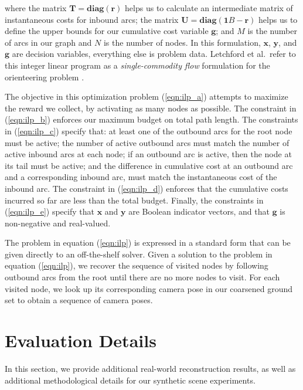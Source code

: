 %
where
the matrix $\mathbf{T} = \mathbf{diag}( \mathbf{r} )$ helps us to calculate an intermediate matrix of instantaneous costs for inbound arcs;
the matrix $\mathbf{U} = \mathbf{diag}( \mathbf{1}B - \mathbf{r} )$ helps us to define the upper bounds for our cumulative cost variable $\mathbf{g}$;
and $M$ is the number of arcs in our graph and $N$ is the number of nodes. 
In this formulation, $\mathbf{x}$, $\mathbf{y}$, and $\mathbf{g}$ are decision variables, everything else is problem data.
Letchford et al.~refer to this integer linear program as a \emph{single-commodity flow} formulation for the orienteering problem \cite{letchford:2013}.

The objective in this optimization problem (\ref{eqn:ilp_a}) attempts to maximize the reward we collect, by activating as many nodes as possible.
The constraint in (\ref{eqn:ilp_b}) enforces our maximum budget on total path length.
The constraints in (\ref{eqn:ilp_c}) specify that: at least one of the outbound arcs for the root node must be active; the number of active outbound arcs must match the number of active inbound arcs at each node; if an outbound arc is active, then the node at its tail must be active; and the difference in cumulative cost at an outbound arc and a corresponding inbound arc, must match the instantaneous cost of the inbound arc.
The constraint in (\ref{eqn:ilp_d}) enforces that the cumulative costs incurred so far are less than the total budget.
Finally, the constraints in (\ref{eqn:ilp_e}) specify that $\mathbf{x}$ and $\mathbf{y}$ are Boolean indicator vectors, and that $\mathbf{g}$ is non-negative and real-valued.

The problem in equation (\ref{eqn:ilp}) is expressed in a standard form that can be given directly to an off-the-shelf solver.
Given a solution to the problem in equation (\ref{eqn:ilp}), we recover the sequence of visited nodes by following outbound arcs from the root until there are no more nodes to visit.
For each visited node, we look up its corresponding camera pose in our coarsened ground set to obtain a sequence of camera poses.

\vspace{-2pt}
\section{Evaluation Details}

In this section, we provide additional real-world reconstruction results, as well as additional methodological details for our synthetic scene experiments.

